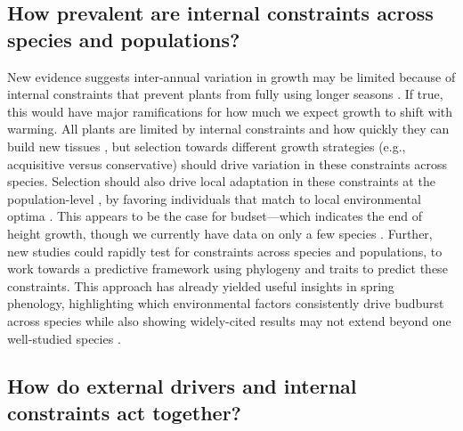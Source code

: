 \documentclass[11pt]{article}
\begin{document}


\subsection*{How prevalent are internal constraints across species and populations?}

New evidence suggests inter-annual variation in growth may be limited because of internal constraints that prevent plants from fully using longer seasons \citep{zohner2023effect}. If true, this would have major ramifications for how much we expect growth to shift with warming. All plants are limited by internal constraints and how quickly they can build new tissues \citep{marchand2021timing,luo2024internal}, but selection towards different growth strategies (e.g., acquisitive versus conservative) should drive variation in these constraints across species. Selection should also drive local adaptation in these constraints at the population-level \citep{mckown2016impacts,soolanayakanahally2013timing}, by favoring individuals that match to local environmental optima \citep{Colautti:2010,mckown2014np}. This appears to be the case for budset---which indicates the end of height growth, though we currently have data on only a few species \citep{aitken2016,zeng2024weak}. Further, new studies could rapidly test for constraints across species and populations, to work towards a predictive framework using phylogeny and traits to predict these constraints. This approach has already yielded useful insights in spring phenology, highlighting which environmental factors consistently drive budburst across species while also showing widely-cited results may not extend beyond one well-studied species \citep{morales2024phylogenetic}. %

\subsection*{How do external drivers and internal constraints act together?}
\end{document}
